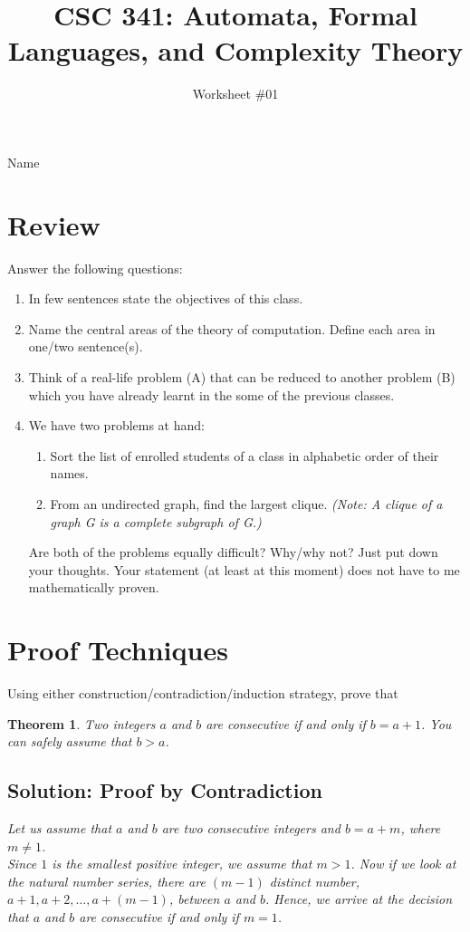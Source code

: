 \documentclass[11pt, oneside]{article}   	%
\title{CSC 341: Automata, Formal Languages, and Complexity Theory}
\author{Worksheet \#01}
\date{}							%
\newtheorem*{theorem*}{Theorem}
\begin{document}
\maketitle
Name \underline{\hspace{10cm}}
\\
\section{Review}
\par Answer the following questions:
\begin{enumerate}
\item In few sentences state the objectives of this class.
\item Name the central areas of the theory of computation. Define each area in one/two sentence(s).
\item Think of a real-life problem (A) that can be reduced to another problem (B) which you have already learnt in the some of the previous classes.
\item We have two problems at hand:
 \begin{enumerate}
 \item Sort the list of enrolled students of a class in alphabetic order of their names.
 \item From an undirected graph, find the largest clique. \emph {(Note: A clique of a graph G is a complete subgraph of G.)}
\end{enumerate}
Are both of the problems equally difficult? Why/why not? Just put down your thoughts. Your statement (at least at this moment) does not have to me mathematically proven.
\end{enumerate}
\newpage
\section{Proof Techniques}
Using either construction/contradiction/induction strategy, prove that

\begin{theorem*}
Two integers $a$ and $b$ are consecutive if and only if $b = a + 1$. You can safely assume that $b > a$.
\subsection{Solution: {\bf Proof by Contradiction}}
Let us assume that $a$ and $b$ are two consecutive integers and $b = a + m$, where $m \ne 1$. \\
Since $1$ is the smallest positive integer, we assume that $m > 1$. Now if we look at the natural number series,
 there are $(m-1)$ distinct number, $a+1, a+2, \dots , a+ (m-1)$, between $a$ and $b$.
 Hence,  we arrive at the decision that $a$ and $b$ are consecutive if and only if $m = 1$.  
\end{theorem*}
\end{document}
